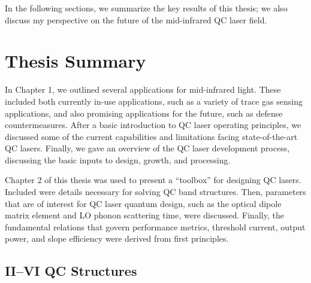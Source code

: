 

In the following sections, we summarize the key results of this thesis; we also discuss my perspective on the future of the mid-infrared QC laser field.


\section{Thesis Summary}

In Chapter 1, we outlined several applications for mid-infrared light.  These included both currently in-use applications, such as a variety of trace gas sensing applications, and also promising applications for the future, such as defense countermeasures.  After a basic introduction to QC laser operating principles, we discussed some of the current capabilities and limitations facing state-of-the-art QC lasers.  Finally, we gave an overview of the QC laser development process, discussing the basic inputs to design, growth, and processing.

Chapter 2 of this thesis was used to present a ``toolbox'' for designing QC lasers.  Included were details necessary for solving QC band structures.  Then, parameters that are of interest for QC laser quantum design, such as the optical dipole matrix element and LO phonon scattering time, were discussed. Finally, the fundamental relations that govern performance metrics, threshold current, output power, and slope efficiency were derived from first principles.


\subsection{II--VI QC Structures}

